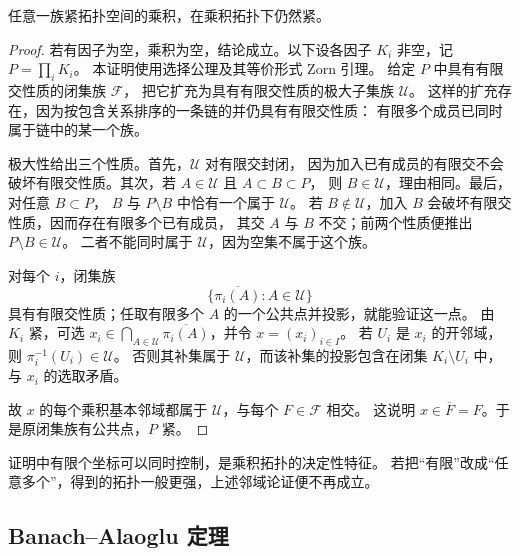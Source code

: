 \begin{theorem}[Tychonoff]\label{b1:thm:tychonoff}
任意一族紧拓扑空间的乘积，在乘积拓扑下仍然紧。
\end{theorem}
\begin{proof}
若有因子为空，乘积为空，结论成立。以下设各因子 \(K_i\) 非空，记 \(P=\prod_iK_i\)。
本证明使用选择公理及其等价形式 Zorn 引理。
给定 \(P\) 中具有有限交性质的闭集族 \(\mathcal F\)，
把它扩充为具有有限交性质的极大子集族 \(\mathcal U\)。
这样的扩充存在，因为按包含关系排序的一条链的并仍具有有限交性质：
有限多个成员已同时属于链中的某一个族。

极大性给出三个性质。首先，\(\mathcal U\) 对有限交封闭，
因为加入已有成员的有限交不会破坏有限交性质。其次，若 \(A\in\mathcal U\) 且 \(A\subset B\subset P\)，
则 \(B\in\mathcal U\)，理由相同。最后，对任意 \(B\subset P\)，
\(B\) 与 \(P\setminus B\) 中恰有一个属于 \(\mathcal U\)。
若 \(B\notin\mathcal U\)，加入 \(B\) 会破坏有限交性质，因而存在有限多个已有成员，
其交 \(A\) 与 \(B\) 不交；前两个性质便推出 \(P\setminus B\in\mathcal U\)。
二者不能同时属于 \(\mathcal U\)，因为空集不属于这个族。

对每个 \(i\)，闭集族
\[
 \{\overline{\pi_i(A)}:A\in\mathcal U\}
\]
具有有限交性质；任取有限多个 \(A\) 的一个公共点并投影，就能验证这一点。
由 \(K_i\) 紧，可选
\(x_i\in\bigcap_{A\in\mathcal U}\overline{\pi_i(A)}\)，并令 \(x=(x_i)_{i\in I}\)。
若 \(U_i\) 是 \(x_i\) 的开邻域，则 \(\pi_i^{-1}(U_i)\in\mathcal U\)。
否则其补集属于 \(\mathcal U\)，而该补集的投影包含在闭集 \(K_i\setminus U_i\) 中，
与 \(x_i\) 的选取矛盾。

故 \(x\) 的每个乘积基本邻域都属于 \(\mathcal U\)，与每个 \(F\in\mathcal F\) 相交。
这说明 \(x\in\overline F=F\)。于是原闭集族有公共点，\(P\) 紧。
\end{proof}

证明中有限个坐标可以同时控制，是乘积拓扑的决定性特征。
若把“有限”改成“任意多个”，得到的拓扑一般更强，上述邻域论证便不再成立。

\subsection{Banach–Alaoglu 定理}
\label{b1:subsec:090302}

